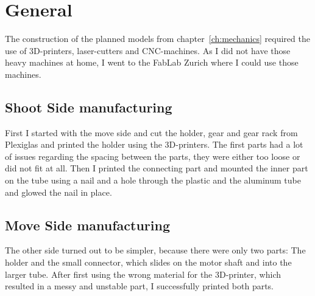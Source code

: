 \section{General}\label{sec:general3}
The construction of the planned models from chapter~\ref{ch:mechanics} required the use of 3D-printers, laser-cutters and CNC-machines.
As I did not have those heavy machines at home, I went to the FabLab Zurich\autocite{fablab} where I could use those machines.

\subsection{Shoot Side manufacturing}\label{subsec:turn-side-manufacturing}
First I started with the move side and cut the holder, gear and gear rack from Plexiglas and printed the holder using the 3D-printers.
The first parts had a lot of issues regarding the spacing between the parts, they were either too loose or did not fit at all.
Then I printed the connecting part and mounted the inner part on the tube using a nail and a hole through the plastic and the aluminum tube and glowed the nail in place.

\subsection{Move Side manufacturing}\label{subsec:move-side-manufacturing}
The other side turned out to be simpler, because there were only two parts: The holder and the small connector, which slides on the motor shaft and into the larger tube.
After first using the wrong material for the 3D-printer, which resulted in a messy and unstable part, I successfully printed both parts.

